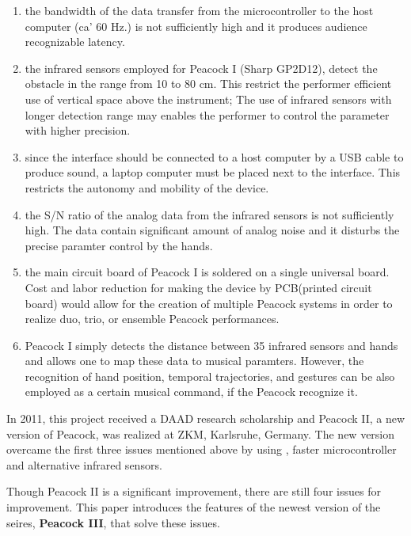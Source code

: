 \documentclass{nime-alternate}
\begin{document}
\begin{enumerate}
\item the bandwidth of the data transfer from the microcontroller to the host computer (ca' 60 Hz.) is not sufficiently high and it produces audience recognizable latency.

\item the infrared sensors employed for Peacock I (Sharp GP2D12), detect the obstacle in the range from 10 to 80 cm. This restrict the performer efficient use of vertical space above the instrument; The use of infrared sensors with longer detection range may enables the performer to control the parameter with higher precision.

\item since the interface should be connected to a host computer by a USB cable to produce sound, a laptop computer must be placed next to the interface. This restricts the autonomy and mobility of the device. 

\item the S/N ratio of the analog data from the infrared sensors is not sufficiently high. The data contain significant amount of analog noise and it disturbs the precise paramter control by the hands.

\item the main circuit board of Peacock I is soldered on a single universal board. Cost and labor reduction for making the device by PCB(printed circuit board) would allow for the creation of multiple Peacock systems in order to realize duo, trio, or ensemble Peacock performances.

\item Peacock I simply detects the distance between 35 infrared sensors and hands and allows one to map these data to musical paramters. However, the recognition of hand position, temporal trajectories, and gestures can be also employed as a certain musical command, if the Peacock recognize it.

\end{enumerate}


In 2011, this project received a DAAD research scholarship and Peacock II, a new version of Peacock, was realized at ZKM, Karlsruhe, Germany. The new version overcame the first three issues mentioned above by using , faster microcontroller\cite{parallax:propeller} and alternative infrared sensors.

Though Peacock II is a significant improvement, there are still four issues for improvement. This paper introduces the features of the newest version of the seires, {\bf Peacock III}, that solve these issues. 
\end{document}
